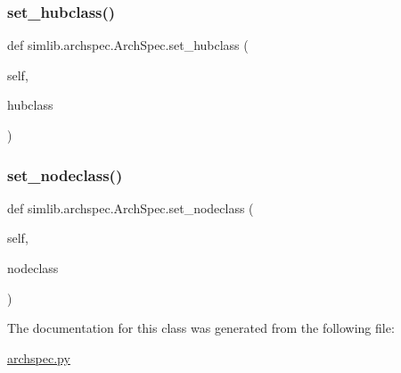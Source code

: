 \mbox{\label{classsimlib_1_1archspec_1_1_arch_spec_a5419a0d3b27b4864a9cea18f3f42ec2f}} 
\subsubsection{\texorpdfstring{set\+\_\+hubclass()}{set\_hubclass()}}
{\footnotesize\ttfamily def simlib.\+archspec.\+Arch\+Spec.\+set\+\_\+hubclass (\begin{DoxyParamCaption}\item[{}]{self,  }\item[{}]{hubclass }\end{DoxyParamCaption})}

\mbox{\label{classsimlib_1_1archspec_1_1_arch_spec_a083a2500010362bcd18101dcf1cc6e6d}} 
\subsubsection{\texorpdfstring{set\+\_\+nodeclass()}{set\_nodeclass()}}
{\footnotesize\ttfamily def simlib.\+archspec.\+Arch\+Spec.\+set\+\_\+nodeclass (\begin{DoxyParamCaption}\item[{}]{self,  }\item[{}]{nodeclass }\end{DoxyParamCaption})}



The documentation for this class was generated from the following file\+:\begin{DoxyCompactItemize}
\item 
\mbox{\hyperlink{archspec_8py}{archspec.\+py}}\end{DoxyCompactItemize}
